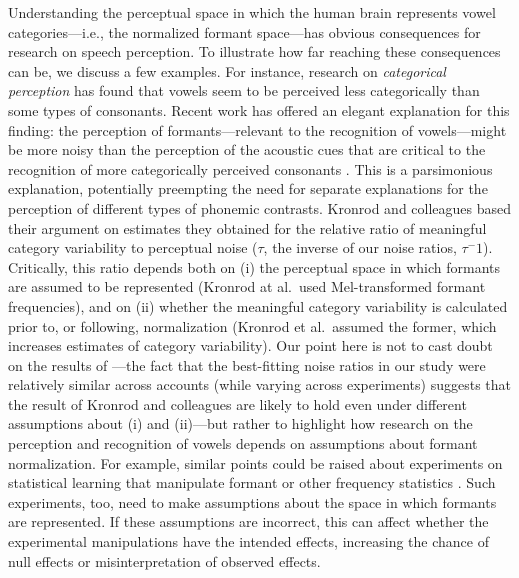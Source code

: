 \documentclass[preprint]{JASA}
\begin{document}
Understanding the perceptual space in which the human brain represents vowel categories---i.e., the normalized formant space---has obvious consequences for research on speech perception. To illustrate how far reaching these consequences can be, we discuss a few examples. For instance, research on \emph{categorical perception} has found that vowels seem to be perceived less categorically than some types of consonants. Recent work has offered an elegant explanation for this finding: the perception of formants---relevant to the recognition of vowels---might be more noisy than the perception of the acoustic cues that are critical to the recognition of more categorically perceived consonants \citep{kronrod2016}. This is a parsimonious explanation, potentially preempting the need for separate explanations for the perception of different types of phonemic contrasts. Kronrod and colleagues based their argument on estimates they obtained for the relative ratio of meaningful category variability to perceptual noise (\(\tau\), the inverse of our noise ratios, \(\tau^-1\)). Critically, this ratio depends both on (i) the perceptual space in which formants are assumed to be represented (Kronrod at al.~used Mel-transformed formant frequencies), and on (ii) whether the meaningful category variability is calculated prior to, or following, normalization (Kronrod et al.~assumed the former, which increases estimates of category variability). Our point here is not to cast doubt on the results of \citet{kronrod2016} ---the fact that the best-fitting noise ratios in our study were relatively similar across accounts (while varying across experiments) suggests that the result of Kronrod and colleagues are likely to hold even under different assumptions about (i) and (ii)---but rather to highlight how research on the perception and recognition of vowels depends on assumptions about formant normalization. For example, similar points could be raised about experiments on statistical learning that manipulate formant or other frequency statistics \citep[e.g.,][]{chladkova2017, colby2018, xie2021, wade2007}. Such experiments, too, need to make assumptions about the space in which formants are represented. If these assumptions are incorrect, this can affect whether the experimental manipulations have the intended effects, increasing the chance of null effects or misinterpretation of observed effects.
\end{document}

